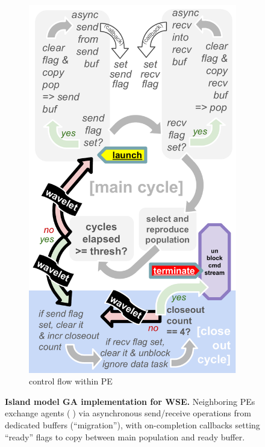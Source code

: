 \begin{figure}[t!]
\begin{subfigure}{0.5\linewidth}
    \includegraphics[width=0.8\linewidth]{img/controlflow-schematic}%
    \vspace{-0.05in}
    \caption{control flow within PE}
    \label{fig:async-ga-schematic-controlflow}
  \end{subfigure}
  \vspace{-0.25in}
  \caption{%
  \textbf{Island model GA implementation for WSE.}
  \footnotesize
  Neighboring PEs exchange agents (🦠) via asynchronous send/receive operations from dedicated buffers (``migration''), with on-completion callbacks setting ``ready'' flags to copy between main population and ready buffer.
  }
  \label{fig:async-ga-schematic}
  \vspace{-0.2in}
\end{figure}

